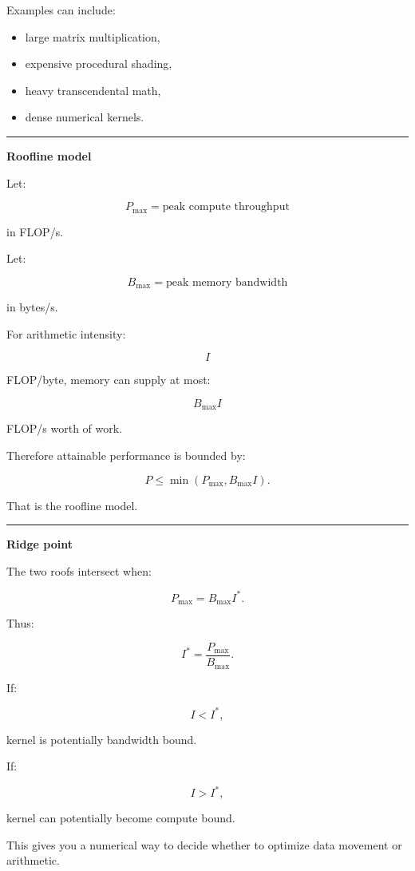 Examples can include:

\begin{itemize}
\tightlist
\item
  large matrix multiplication,
\item
  expensive procedural shading,
\item
  heavy transcendental math,
\item
  dense numerical kernels.
\end{itemize}

\begin{center}\rule{0.5\linewidth}{0.5pt}\end{center}

\textbf{Roofline model}

Let:

\[
P_{\max}
=
\text{peak compute throughput}
\]

in FLOP/s.

Let:

\[
B_{\max}
=
\text{peak memory bandwidth}
\]

in bytes/s.

For arithmetic intensity:

\[
I
\]

FLOP/byte, memory can supply at most:

\[
B_{\max}I
\]

FLOP/s worth of work.

Therefore attainable performance is bounded by:

\[
\boxed{
P
\le
\min(
P_{\max},
B_{\max}I
).
}
\]

That is the roofline model.

\begin{center}\rule{0.5\linewidth}{0.5pt}\end{center}

\textbf{Ridge point}

The two roofs intersect when:

\[
P_{\max}
=
B_{\max}I^*.
\]

Thus:

\[
\boxed{
I^*
=
\frac{
P_{\max}
}{
B_{\max}
}.
}
\]

If:

\[
I<I^*,
\]

kernel is potentially bandwidth bound.

If:

\[
I>I^*,
\]

kernel can potentially become compute bound.

This gives you a numerical way to decide whether to optimize data movement or arithmetic.

